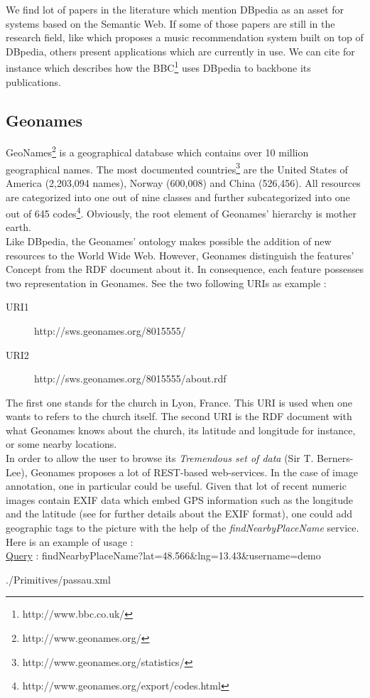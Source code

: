 We find lot of papers in the literature which mention DBpedia as an asset for systems based on the Semantic Web. If some of those papers are still in the research field, like \cite{passant2010dbrec} which proposes a music recommendation system built on top of DBpedia, others present  applications which are currently in use. We can cite for instance \cite{kobilarov2009media} which describes how the BBC\footnote{http://www.bbc.co.uk/} uses DBpedia to backbone its publications. 

\subsection{Geonames} %
\label{sub:geonames}

GeoNames\footnote{http://www.geonames.org/} is a geographical database which contains over 10 million geographical names. The most documented countries\footnote{http://www.geonames.org/statistics/} are the United States of America (2,203,094 names), Norway (600,008) and China (526,456). All resources are categorized into one out of nine classes and further subcategorized into one out of 645 codes\footnote{http://www.geonames.org/export/codes.html}. Obviously, the root element of Geonames' hierarchy is mother earth.\\

Like DBpedia, the Geonames' ontology makes possible the addition of new resources to the World Wide Web. However, Geonames distinguish the features' Concept from the RDF document about it. In consequence, each feature possesses two representation in Geonames. See the two following URIs as example :
\begin{description}
\item[URI1] http://sws.geonames.org/8015555/
\item[URI2] http://sws.geonames.org/8015555/about.rdf
\end{description}
The first one stands for the  church in Lyon, France. This URI is used when one wants to refers to the church itself. The second URI is the RDF document with what Geonames knows about the church, its latitude and longitude for instance, or some nearby locations.\\

In order to allow the user to browse its \emph{Tremendous set of data} (Sir T. Berners-Lee), Geonames proposes a lot of REST-based web-services. In the case of image annotation, one in particular could be useful. Given that lot of recent numeric images contain EXIF data which embed GPS information such as the longitude and the latitude (see \cite{tevsic2005metadata} for further details about the EXIF format), one could add geographic tags to the picture with the help of the \textit{findNearbyPlaceName} service. Here is an example of usage :\\
\underline{Query} : findNearbyPlaceName?lat=48.566\&lng=13.43\&username=demo 

	{./Primitives/passau.xml}

